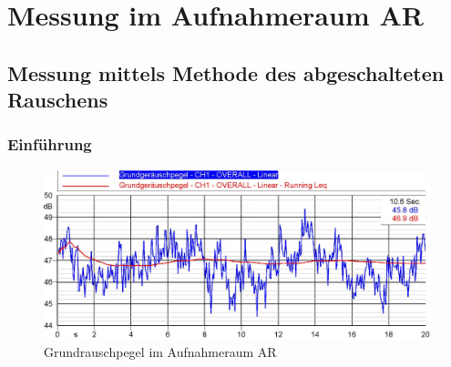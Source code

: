 \documentclass[11pt]{report}
\begin{document}
\section{Messung im Aufnahmeraum AR}

\subsection{Messung mittels Methode des abgeschalteten Rauschens}
\subsubsection{Einf\"uhrung}

\begin{figure}[htbp]
\begin{center}
\includegraphics[width=14cm,keepaspectratio=true]{Grundrauschpegel}
\caption{Grundrauschpegel im Aufnahmeraum AR}
\label{fig:i2geometrics}
\end{center}
\end{figure}
\end{document}
